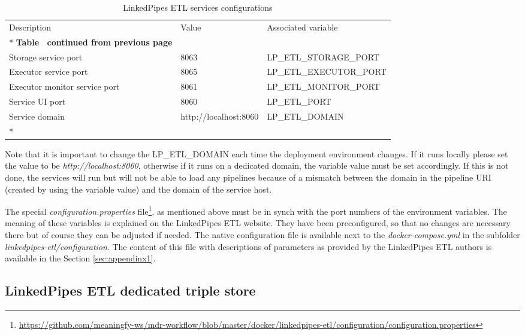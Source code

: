 	
	\begin{longtable}[c]{@{}p{5cm}p{4cm}l@{}}
		\toprule
		Description & Value & Associated variable \\* \midrule
		\endfirsthead
		\multicolumn{3}{c}%
		{{\bfseries Table \thetable\ continued from previous page}} \\
		\endhead
		\bottomrule
		\endfoot
		\endlastfoot
		Storage service port & 8063 & LP\_ETL\_STORAGE\_PORT \\		
		Executor service port & 8065 & LP\_ETL\_EXECUTOR\_PORT \\
		Executor monitor service port & 8061 & LP\_ETL\_MONITOR\_PORT \\		
		Service UI port & 8060 & LP\_ETL\_PORT \\
		Service domain & http://localhost:8060 & LP\_ETL\_DOMAIN \\* \bottomrule
		\caption{LinkedPipes ETL services configurations}
		\label{tab:my-table5}\\
	\end{longtable}
	
	Note that it is important to change the LP\_ETL\_DOMAIN each time the deployment environment changes. If it runs locally please set the value to be \textit{http://localhost:8060}, otherwise if it runs on a dedicated domain, the variable value must be set accordingly. If this is not done, the services will run but will not be able to load any pipelines because of a mismatch between the domain in the pipeline URI (created by using the variable value) and the domain of the service host. 
	
	The special \textit{configuration.properties} file\footnote{\url{https://github.com/meaningfy-ws/mdr-workflow/blob/master/docker/linkedpipes-etl/configuration/configuration.properties}}, as mentioned above must be in synch with the port numbers of the environment variables. The meaning of these variables is explained on the LinkedPipes ETL website. They have been preconfigured, so that no changes are necessary there but of course they can be adjusted if needed. The native configuration file is available next to the \textit{docker-compose.yml} in the subfolder \textit{linkedpipes-etl/configuration}. The content of this file with descriptions of parameters as provided by the LinkedPipes ETL authors is available in the Section \ref{sec:appendinx1}. 	
	
	\subsection{LinkedPipes ETL dedicated triple store}
	
